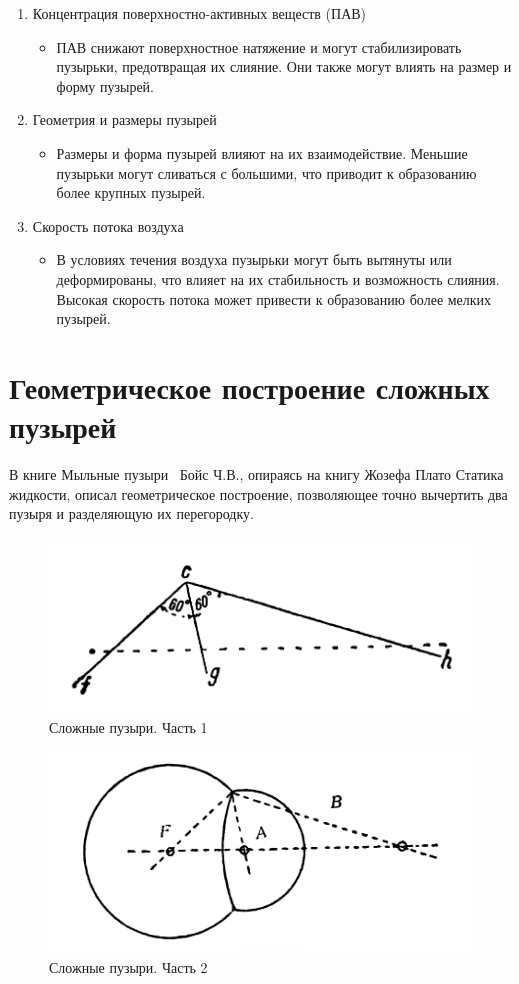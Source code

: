 \begin{enumerate}[label={\arabic*)}]
	\item Концентрация поверхностно-активных веществ (ПАВ)
	\begin{itemize}	
		\item ПАВ снижают поверхностное натяжение и могут стабилизировать пузырьки, предотвращая их слияние. Они также могут влиять на размер и форму пузырей.
	\end{itemize}
	\item Геометрия и размеры пузырей
	\begin{itemize}	
		\item Размеры и форма пузырей влияют на их взаимодействие. Меньшие пузырьки могут сливаться с большими, что приводит к образованию более крупных пузырей.
	\end{itemize}	
	\item Скорость потока воздуха
	\begin{itemize}	
		\item В условиях течения воздуха пузырьки могут быть вытянуты или деформированы, что влияет на их стабильность и возможность слияния. Высокая скорость потока может привести к образованию более мелких пузырей.
	\end{itemize}	
\end{enumerate}

\section{Геометрическое построение сложных пузырей}

В книге \guillemotleft Мыльные пузыри\guillemotright~\cite{boys} Бойс Ч.В., опираясь на книгу Жозефа Плато \guillemotleft Статика жидкости\guillemotright, описал геометрическое построение, позволяющее точно вычертить два пузыря и разделяющую их перегородку.

\begin{figure}[h]
	\centering
	\includegraphics[width=0.5\linewidth]{pictures/drawing_cluster_1.png}
	\caption{Сложные пузыри. Часть 1}
	\label{fig:drawing_cluster_1}
\end{figure}
\begin{figure}[h]
	\centering
	\includegraphics[width=0.7\linewidth]{pictures/drawing_cluster_2.png}
	\caption{Сложные пузыри. Часть 2}
	\label{fig:drawing_cluster_2}
\end{figure}

